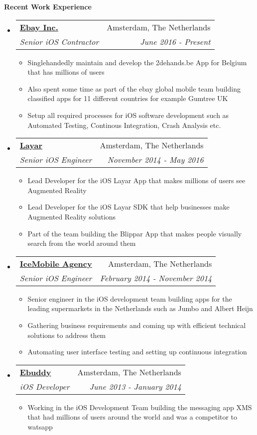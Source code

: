 \documentclass[letterpaper,11pt]{article}
\makeatletter
\newcommand{\resitem}[1]{\item #1 \vspace{-2pt}}
\newcommand{\resheading}[1]{{\large \colorbox{mygrey}{\begin{minipage}{\textwidth}{\textbf{#1 \vphantom{p\^{E}}}}\end{minipage}}}}
\newcommand{\ressubheading}[4]{
\begin{tabular*}{7.0in}{l@{\extracolsep{\fill}}r}
    \textbf{#1} & #2 \\
    \textit{#3} & \textit{#4} \\
\end{tabular*}\vspace{-6pt}}
\makeatother
\begin{document}
\vspace{0.2in}

\resheading{Recent Work Experience}
\begin{itemize}

\item
    \ressubheading{\href{https://www.ebay.com/}{Ebay Inc.}}{Amsterdam, The Netherlands}{Senior iOS Contractor}{June 2016 - Present}
    \begin{itemize}
        \resitem{Singlehandedly maintain and develop the 2dehands.be App for Belgium that has millions of users}
        \resitem{Also spent some time as part of the ebay global mobile team building classified apps for 11 different countries for example Gumtree UK}
         \resitem{Setup all required processes for iOS software development such as Automated Testing, Continous Integration, Crash Analysis etc.}
    \end{itemize}

\item
    \ressubheading{\href{https://www.layar.com/}{Layar}}{Amsterdam, The Netherlands}{Senior iOS Engineer}{November 2014 - May 2016}
    \begin{itemize}
        \resitem{Lead Developer for the iOS Layar App that makes millions of users see Augmented Reality}
        \resitem{Lead Developer for the iOS Layar SDK that help businesses make Augmented Reality solutions}
        \resitem{Part of the team building the Blippar App that makes people visually search from the world around them}
    \end{itemize}

\item
    \ressubheading{\href{http://www.icemobile.com}{IceMobile Agency}}{Amsterdam, The Netherlands}{Senior iOS Engineer}{February 2014 - November 2014}
    \begin{itemize}
        \resitem{Senior engineer in the iOS development team building apps for the leading supermarkets in the Netherlands such as Jumbo and Albert Heijn}
        \resitem{Gathering business requirements and coming up with efficient technical solutions to address them}
        \resitem{Automating user interface testing and setting up continuous integration}
    \end{itemize}

\item
    \ressubheading{\href{http://www.ebuddy.com}{Ebuddy}}{Amsterdam, The Netherlands}{iOS Developer}{June 2013 - January 2014}
    \begin{itemize}
        \resitem{Working in the iOS Development Team building the messaging app XMS that had millions of users around the world and was a competitor to watsapp}
    \end{itemize}

\end{itemize}
\end{document}
